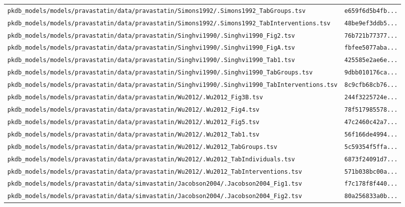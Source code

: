 \documentclass{article}
\begin{document}
\begin{longtable}{ll}
\texttt{pkdb\_models/models/pravastatin/data/pravastatin/Simons1992/.Simons1992\_TabGroups.tsv} & \texttt{e659f6d5b4fb...} \\
\texttt{pkdb\_models/models/pravastatin/data/pravastatin/Simons1992/.Simons1992\_TabInterventions.tsv} & \texttt{48be9ef3ddb5...} \\
\texttt{pkdb\_models/models/pravastatin/data/pravastatin/Singhvi1990/.Singhvi1990\_Fig2.tsv} & \texttt{76b721b77377...} \\
\texttt{pkdb\_models/models/pravastatin/data/pravastatin/Singhvi1990/.Singhvi1990\_FigA.tsv} & \texttt{fbfee5077aba...} \\
\texttt{pkdb\_models/models/pravastatin/data/pravastatin/Singhvi1990/.Singhvi1990\_Tab1.tsv} & \texttt{425585e2ae6e...} \\
\texttt{pkdb\_models/models/pravastatin/data/pravastatin/Singhvi1990/.Singhvi1990\_TabGroups.tsv} & \texttt{9dbb010176ca...} \\
\texttt{pkdb\_models/models/pravastatin/data/pravastatin/Singhvi1990/.Singhvi1990\_TabInterventions.tsv} & \texttt{8c9cfb68cb76...} \\
\texttt{pkdb\_models/models/pravastatin/data/pravastatin/Wu2012/.Wu2012\_Fig3B.tsv} & \texttt{244f3225724e...} \\
\texttt{pkdb\_models/models/pravastatin/data/pravastatin/Wu2012/.Wu2012\_Fig4.tsv} & \texttt{78f517985578...} \\
\texttt{pkdb\_models/models/pravastatin/data/pravastatin/Wu2012/.Wu2012\_Fig5.tsv} & \texttt{47c2460c42a7...} \\
\texttt{pkdb\_models/models/pravastatin/data/pravastatin/Wu2012/.Wu2012\_Tab1.tsv} & \texttt{56f166de4994...} \\
\texttt{pkdb\_models/models/pravastatin/data/pravastatin/Wu2012/.Wu2012\_TabGroups.tsv} & \texttt{5c59354f5ffa...} \\
\texttt{pkdb\_models/models/pravastatin/data/pravastatin/Wu2012/.Wu2012\_TabIndividuals.tsv} & \texttt{6873f24091d7...} \\
\texttt{pkdb\_models/models/pravastatin/data/pravastatin/Wu2012/.Wu2012\_TabInterventions.tsv} & \texttt{571b038bc00a...} \\
\texttt{pkdb\_models/models/pravastatin/data/simvastatin/Jacobson2004/.Jacobson2004\_Fig1.tsv} & \texttt{f7c178f8f440...} \\
\texttt{pkdb\_models/models/pravastatin/data/simvastatin/Jacobson2004/.Jacobson2004\_Fig2.tsv} & \texttt{80a256833a0b...} \\

\end{longtable}
\end{document}
